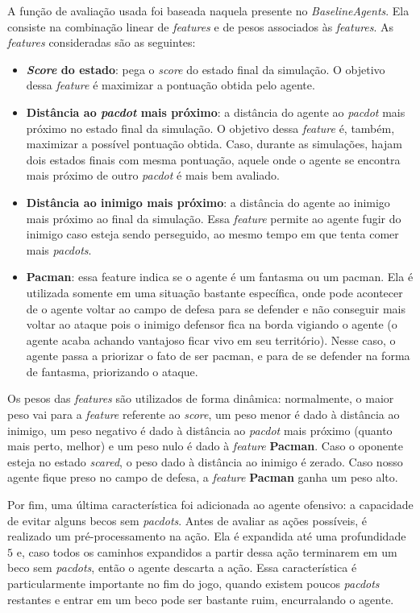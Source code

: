 \documentclass[a4paper,12pt]{article}
\begin{document}
A função de avaliação usada foi
baseada naquela presente no \textit{BaselineAgents}. Ela consiste na
combinação linear de \textit{features} e de pesos associados às \textit{features}.
As \textit{features} consideradas são as seguintes:

\begin{itemize}
  \item \textbf{\textit{Score} do estado}: pega o \textit{score} do
  estado final da simulação. O objetivo dessa \textit{feature} é maximizar a pontuação
  obtida pelo agente.
  \item \textbf{Distância ao \textit{pacdot} mais próximo}: a distância do agente ao \textit{pacdot}
  mais próximo no estado final da simulação. O objetivo dessa \textit{feature} é,
  também, maximizar a possível pontuação obtida. Caso, durante as simulações, hajam
  dois estados finais com mesma pontuação, aquele onde o agente se encontra
  mais próximo de outro \textit{pacdot} é mais bem avaliado.
  \item \textbf{Distância ao inimigo mais próximo}: a distância do agente ao inimigo
  mais próximo ao final da simulação. Essa \textit{feature} permite ao agente fugir
  do inimigo caso esteja sendo perseguido, ao mesmo tempo em que tenta comer mais
  \textit{pacdots}.
  \item \textbf{Pacman}: essa feature indica se o agente é um fantasma ou um
  pacman. Ela é utilizada somente em uma situação bastante específica, onde pode
  acontecer de o agente voltar ao campo de defesa para se defender e não conseguir
  mais voltar ao ataque pois o inimigo defensor fica na borda vigiando o agente (o
  agente acaba achando vantajoso ficar vivo em seu território).
  Nesse caso, o agente passa a priorizar o fato de ser pacman, e para de se defender
  na forma de fantasma, priorizando o ataque.
\end{itemize}

Os pesos das \textit{features} são utilizados de forma dinâmica: normalmente, o maior peso
vai para a \textit{feature} referente ao \textit{score}, um peso menor é dado à distância ao
inimigo, um peso negativo é dado à distância ao \textit{pacdot} mais próximo (quanto mais perto,
melhor) e um peso nulo é dado à \textit{feature} \textbf{Pacman}. Caso o oponente esteja no
estado \textit{scared}, o peso dado à distância ao inimigo é zerado. Caso nosso agente fique preso
no campo de defesa, a \textit{feature} \textbf{Pacman} ganha um peso alto.

Por fim, uma última característica foi adicionada ao agente ofensivo: a capacidade de evitar
alguns becos sem \textit{pacdots}. Antes de avaliar as ações possíveis, é realizado um
pré-processamento na ação. Ela é expandida até uma profundidade $5$ e, caso todos os caminhos
expandidos a partir dessa ação terminarem em um beco sem \textit{pacdots}, então o agente descarta a
ação. Essa característica é particularmente importante no fim do jogo, quando existem poucos
\textit{pacdots} restantes e entrar em um beco pode ser bastante ruim, encurralando o agente.
\end{document}
